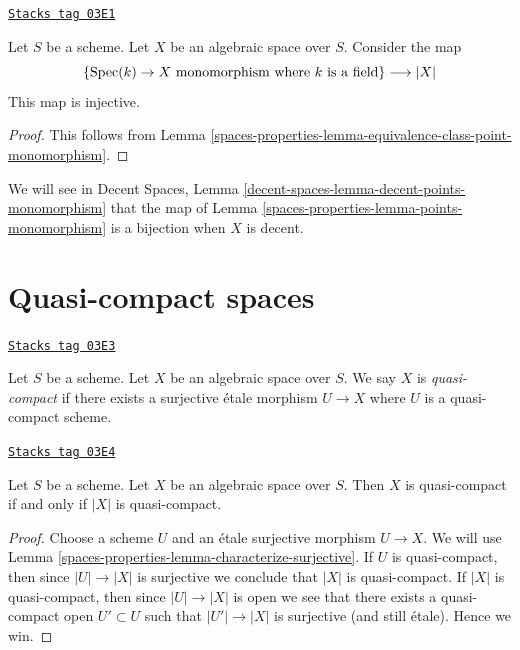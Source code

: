 \begin{lemma}
\label{spaces-properties-lemma-points-monomorphism}
\href{https://stacks.math.columbia.edu/tag/03E1}{\texttt{Stacks tag 03E1}}

Let $S$ be a scheme. Let $X$ be an algebraic space over $S$.
Consider the map
$$
\{\operatorname{Spec}(k) \to X \text{ monomorphism where }k\text{ is a field}\}
\longrightarrow
|X|
$$
This map is injective.
\end{lemma}

\begin{proof}
This follows from Lemma \ref{spaces-properties-lemma-equivalence-class-point-monomorphism}.
\end{proof}

We will see in Decent Spaces,
Lemma \ref{decent-spaces-lemma-decent-points-monomorphism}
that the map of Lemma \ref{spaces-properties-lemma-points-monomorphism}
is a bijection when $X$ is decent.

\section{Quasi-compact spaces}
\label{spaces-properties-section-quasi-compact}
\begin{definition}
\label{spaces-properties-definition-quasi-compact}
\href{https://stacks.math.columbia.edu/tag/03E3}{\texttt{Stacks tag 03E3}}

Let $S$ be a scheme.
Let $X$ be an algebraic space over $S$.
We say $X$ is {\it quasi-compact} if there exists a surjective
\'etale morphism $U \to X$ where $U$ is a quasi-compact scheme.
\end{definition}

\begin{lemma}
\label{spaces-properties-lemma-quasi-compact-space}
\href{https://stacks.math.columbia.edu/tag/03E4}{\texttt{Stacks tag 03E4}}

Let $S$ be a scheme.
Let $X$ be an algebraic space over $S$.
Then $X$ is quasi-compact if and only if $|X|$ is quasi-compact.
\end{lemma}

\begin{proof}
Choose a scheme $U$ and an \'etale surjective morphism $U \to X$.
We will use Lemma \ref{spaces-properties-lemma-characterize-surjective}.
If $U$ is quasi-compact, then since $|U| \to |X|$ is surjective
we conclude that $|X|$ is quasi-compact.
If $|X|$ is quasi-compact, then since $|U| \to |X|$ is open
we see that there exists a quasi-compact open $U' \subset U$
such that $|U'| \to |X|$ is surjective (and still \'etale).
Hence we win.
\end{proof}


